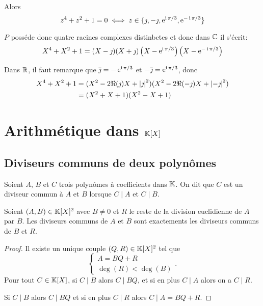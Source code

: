 Alors
\begin{equation}
  z^4+z^2+1=0 \iff z \in \{\jmath, -\jmath, \operatorname{e}^{\operatorname{i}\pi/3}, \operatorname{e}^{-\operatorname{i}\pi/3}\}
\end{equation}

\(P\) posséde donc quatre racines complexes distinbctes et donc dans \(\mathbb{C}\) il 
s'écrit:
\begin{equation}
  X^4+X^2+1 = 
  (X-\jmath)(X+\jmath)\left(X-\operatorname{e}^{\operatorname{i}\pi/3}\right)\left(X-\operatorname{e}^{-\operatorname{i}\pi/3}\right)
\end{equation}

Dans \(\mathbb{R}\), il faut remarque que \(\overline{\jmath}=-\operatorname{e}^{\operatorname{i}\pi/3}\) et 
\(-\overline{\jmath}=\operatorname{e}^{\operatorname{i}\pi/3}\), donc
\begin{align}
  X^4+X^2+1 &= 
  (X^2-2\Re(\jmath)X+\left\lvert\jmath\right\rvert^2)(X^2-2\Re(-\jmath)X+\left\lvert-\jmath\right\rvert^2)\\
  &=(X^2+X+1)(X^2-X+1)
\end{align}

\section{Arithmétique dans \(\mathbb{K}[X]\)}

\subsection{Diviseurs communs de deux polynômes}

\begin{defdef}
  Soient \(A\), \(B\) et \(C\) trois polynômes à coefficients dans \(\mathbb{K}\). On 
  dit que \(C\) est un diviseur commun à \(A\) et \(B\) lorsque \(C\mid{}A\) et 
  \(C\mid{}B\).
\end{defdef}

\begin{prop}
  Soient \((A,B)\in\mathbb{K}[X]^2\) avec \(B \neq 0\) et \(R\) le reste de la division 
  euclidienne de \(A\) par \(B\). Les diviseurs communs de \(A\) et \(B\) sont 
  exactements les diviseurs communs de \(B\) et \(R\).
\end{prop}
\begin{proof}
  Il existe un unique couple \((Q,R) \in \mathbb{K}[X]^2\) tel que \begin{equation}
    \begin{cases} A=BQ+R \\ \deg(R) < \deg(B) \end{cases}.
  \end{equation}
  Pour tout \(C \in \mathbb{K}[X]\), si  \(C\mid{}B\) alors \(C\mid{}BQ\), et si en plus 
  \(C\mid{}A\) alors on a \(C\mid{}R\).

  Si \(C\mid{}B\) alors \(C\mid{}BQ\) et si en plus \(C\mid{}R\) alors 
  \(C\mid{}A=BQ+R\).
\end{proof}

